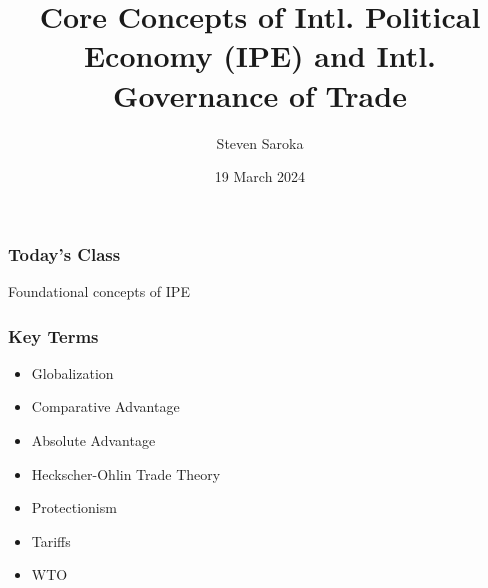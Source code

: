 \documentclass{beamer}
\title[IPE Core Concepts]{\LARGE{Core Concepts of Intl. Political Economy (IPE) and Intl. Governance of Trade}}
\author[POLI 150]{Steven Saroka}
\institute{POLI 150}
\date{19 March 2024}
\begin{document}
\begin{frame}
\titlepage %
\end{frame}










\begin{frame} 
	\frametitle{\LARGE{Today's Class}}
	\begin{itemize}
		\Large{

			\item Foundational concepts of IPE
		}
	\end{itemize}
\end{frame}


\begin{frame} 
	\frametitle{\LARGE{Key Terms}}
	\begin{itemize}
		\item Globalization
		\item Comparative Advantage
		\item Absolute Advantage
		\item Heckscher-Ohlin Trade Theory
		\item Protectionism
		\item Tariffs
		\item WTO
	\end{itemize}
\end{frame}
\end{document}
